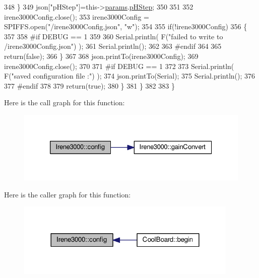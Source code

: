 \begin{DoxyCode}
348             \}
349             json[\textcolor{stringliteral}{"pHStep"}]=this->\hyperlink{class_irene3000_a136585a5ee7f9ac6ab52175fa153f8e3}{params}.\hyperlink{struct_irene3000_1_1parameters___t_a61cfcc2539d5f630e9071f3753aba9fe}{pHStep};
350 
351 
352             irene3000Config.close();
353             irene3000Config = SPIFFS.open(\textcolor{stringliteral}{"/irene3000Config.json"}, \textcolor{stringliteral}{"w"});
354 
355             \textcolor{keywordflow}{if}(!irene3000Config)
356             \{
357             
358 \textcolor{preprocessor}{            #if DEBUG == 1}
359 
360                 Serial.println( F(\textcolor{stringliteral}{"failed to write to /irene3000Config.json"}) );
361                 Serial.println();
362             
363 \textcolor{preprocessor}{            #endif }
364 
365                 \textcolor{keywordflow}{return}(\textcolor{keyword}{false});
366             \}
367 
368             json.printTo(irene3000Config);
369             irene3000Config.close();
370             
371 \textcolor{preprocessor}{        #if DEBUG == 1 }
372 
373             Serial.println( F(\textcolor{stringliteral}{"saved configuration file :"})  );
374             json.printTo(Serial);
375             Serial.println();
376         
377 \textcolor{preprocessor}{        #endif}
378 
379             \textcolor{keywordflow}{return}(\textcolor{keyword}{true}); 
380         \}
381     \}   
382 
383 \}
\end{DoxyCode}
Here is the call graph for this function\+:\nopagebreak
\begin{figure}[H]
\begin{center}
\leavevmode
\includegraphics[width=326pt]{d6/d03/class_irene3000_afed5c35e4b23963c157847ef27c11e9c_cgraph}
\end{center}
\end{figure}
Here is the caller graph for this function\+:\nopagebreak
\begin{figure}[H]
\begin{center}
\leavevmode
\includegraphics[width=300pt]{d6/d03/class_irene3000_afed5c35e4b23963c157847ef27c11e9c_icgraph}
\end{center}
\end{figure}
\mbox{\label{class_irene3000_abcad62d1201a59f8dd3ba87048002728}} 
